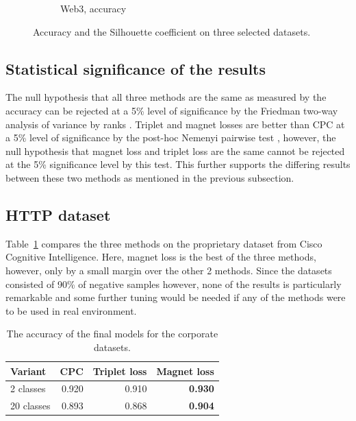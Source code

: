 \begin{figure}
\begin{subfigure}[t]{0.32\textwidth}
    \caption{Web3, accuracy}
  \end{subfigure}
  \caption{Accuracy and the Silhouette coefficient on three selected datasets.}\label{fig:public-comparison}
\end{figure}

\subsection{Statistical significance of the results}

The null hypothesis that all three methods are the same as measured by the accuracy can be rejected at a 5\% level of significance by the Friedman two-way analysis of variance by ranks \cite{friedman_use_1937}. Triplet and magnet losses are better than CPC at a 5\% level of significance by the post-hoc Nemenyi pairwise test \cite{nemenyi_distribution-free_1963}, however, the null hypothesis that magnet loss and triplet loss are the same cannot be rejected at the 5\% significance level by this test. This further supports the differing results between these two methods as mentioned in the previous subsection.

\subsection{HTTP dataset}

Table~\ref{tab:cisco-accuracy} compares the three methods on the proprietary dataset from Cisco Cognitive Intelligence. Here, magnet loss is the best of the three methods, however, only by a small margin over the other 2 methods. Since the datasets consisted of 90\% of negative samples however, none of the results is particularly remarkable and some further tuning would be needed if any of the methods were to be used in real environment.

\begin{table}
  \centering
  \begin{tabular}{lrrr}
    \toprule
    Variant    & CPC   & Triplet loss & Magnet loss \\
    \midrule
    2 classes  & 0.920 & 0.910        & \textbf{0.930} \\
    20 classes & 0.893 & 0.868        & \textbf{0.904} \\
    \bottomrule
  \end{tabular}
  \caption{The accuracy of the final models for the corporate datasets.}\label{tab:cisco-accuracy}
\end{table}
